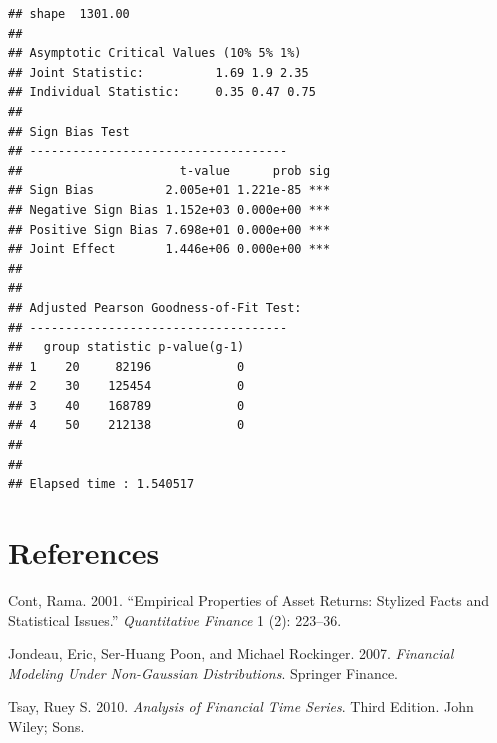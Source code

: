 \documentclass[11pt,]{article}
\begin{document}
\begin{verbatim}
## shape  1301.00
## 
## Asymptotic Critical Values (10% 5% 1%)
## Joint Statistic:          1.69 1.9 2.35
## Individual Statistic:     0.35 0.47 0.75
## 
## Sign Bias Test
## ------------------------------------
##                      t-value      prob sig
## Sign Bias          2.005e+01 1.221e-85 ***
## Negative Sign Bias 1.152e+03 0.000e+00 ***
## Positive Sign Bias 7.698e+01 0.000e+00 ***
## Joint Effect       1.446e+06 0.000e+00 ***
## 
## 
## Adjusted Pearson Goodness-of-Fit Test:
## ------------------------------------
##   group statistic p-value(g-1)
## 1    20     82196            0
## 2    30    125454            0
## 3    40    168789            0
## 4    50    212138            0
## 
## 
## Elapsed time : 1.540517
\end{verbatim}

\section*{References}\label{references}

\hypertarget{refs}{}
\hypertarget{ref-Cont:2001}{}
Cont, Rama. 2001. ``Empirical Properties of Asset Returns: Stylized
Facts and Statistical Issues.'' \emph{Quantitative Finance} 1 (2):
223--36.

\hypertarget{ref-Jondeau_Poon_Rockinger:2007}{}
Jondeau, Eric, Ser-Huang Poon, and Michael Rockinger. 2007.
\emph{Financial Modeling Under Non-Gaussian Distributions}. Springer
Finance.

\hypertarget{ref-Tsay:2010}{}
Tsay, Ruey S. 2010. \emph{Analysis of Financial Time Series}. Third
Edition. John Wiley; Sons.
\end{document}
